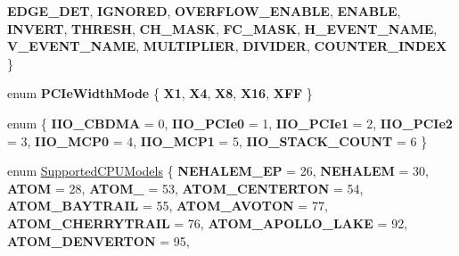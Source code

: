 \begin{DoxyCompactItemize}
{\bfseries E\+D\+G\+E\+\_\+\+D\+ET}, 
{\bfseries I\+G\+N\+O\+R\+ED}, 
{\bfseries O\+V\+E\+R\+F\+L\+O\+W\+\_\+\+E\+N\+A\+B\+LE}, 
\newline
{\bfseries E\+N\+A\+B\+LE}, 
{\bfseries I\+N\+V\+E\+RT}, 
{\bfseries T\+H\+R\+E\+SH}, 
{\bfseries C\+H\+\_\+\+M\+A\+SK}, 
\newline
{\bfseries F\+C\+\_\+\+M\+A\+SK}, 
{\bfseries H\+\_\+\+E\+V\+E\+N\+T\+\_\+\+N\+A\+ME}, 
{\bfseries V\+\_\+\+E\+V\+E\+N\+T\+\_\+\+N\+A\+ME}, 
{\bfseries M\+U\+L\+T\+I\+P\+L\+I\+ER}, 
\newline
{\bfseries D\+I\+V\+I\+D\+ER}, 
{\bfseries C\+O\+U\+N\+T\+E\+R\+\_\+\+I\+N\+D\+EX}
 \}
\item 
\mbox{\label{class_p_c_m_a8b95584dd1ea84c9f005dd0413c1dd0f}} 
enum {\bfseries P\+C\+Ie\+Width\+Mode} \{ \newline
{\bfseries X1}, 
{\bfseries X4}, 
{\bfseries X8}, 
{\bfseries X16}, 
\newline
{\bfseries X\+FF}
 \}
\item 
\mbox{\label{class_p_c_m_a6bc57e347e286d0299c9329f37bb7b64}} 
enum \{ \newline
{\bfseries I\+I\+O\+\_\+\+C\+B\+D\+MA} = 0, 
{\bfseries I\+I\+O\+\_\+\+P\+C\+Ie0} = 1, 
{\bfseries I\+I\+O\+\_\+\+P\+C\+Ie1} = 2, 
{\bfseries I\+I\+O\+\_\+\+P\+C\+Ie2} = 3, 
\newline
{\bfseries I\+I\+O\+\_\+\+M\+C\+P0} = 4, 
{\bfseries I\+I\+O\+\_\+\+M\+C\+P1} = 5, 
{\bfseries I\+I\+O\+\_\+\+S\+T\+A\+C\+K\+\_\+\+C\+O\+U\+NT} = 6
 \}
\item 
\mbox{\label{class_p_c_m_a7ca50e5907ef2b7cf7c81a5e069135f7}} 
enum \mbox{\hyperlink{class_p_c_m_a7ca50e5907ef2b7cf7c81a5e069135f7}{Supported\+C\+P\+U\+Models}} \{ \newline
{\bfseries N\+E\+H\+A\+L\+E\+M\+\_\+\+EP} = 26, 
{\bfseries N\+E\+H\+A\+L\+EM} = 30, 
{\bfseries A\+T\+OM} = 28, 
{\bfseries A\+T\+O\+M\+\_} = 53, 
\newline
{\bfseries A\+T\+O\+M\+\_\+\+C\+E\+N\+T\+E\+R\+T\+ON} = 54, 
{\bfseries A\+T\+O\+M\+\_\+\+B\+A\+Y\+T\+R\+A\+IL} = 55, 
{\bfseries A\+T\+O\+M\+\_\+\+A\+V\+O\+T\+ON} = 77, 
{\bfseries A\+T\+O\+M\+\_\+\+C\+H\+E\+R\+R\+Y\+T\+R\+A\+IL} = 76, 
\newline
{\bfseries A\+T\+O\+M\+\_\+\+A\+P\+O\+L\+L\+O\+\_\+\+L\+A\+KE} = 92, 
{\bfseries A\+T\+O\+M\+\_\+\+D\+E\+N\+V\+E\+R\+T\+ON} = 95, 

\end{DoxyCompactItemize}
